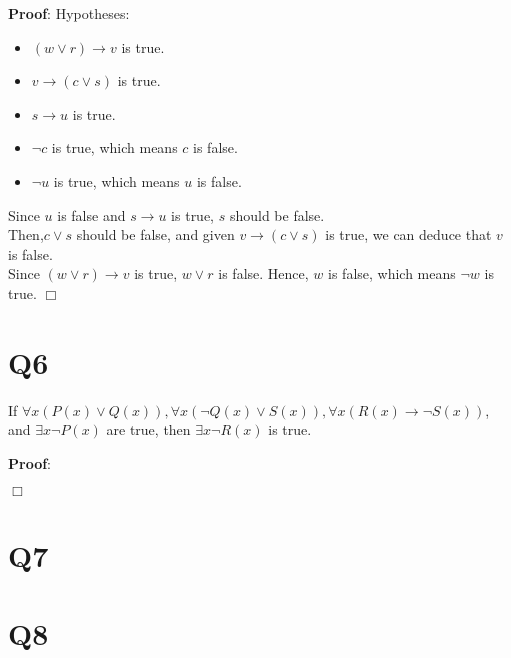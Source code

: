 \documentclass[11pt]{article}
\newenvironment{qparts}{\begin{enumerate}[{(}a{)}]}{\end{enumerate}}
\def\endproofmark{$\Box$}
\newenvironment{proof}{\par{\bf Proof}:}{\endproofmark\smallskip}
\begin{document}
\begin{qparts}
\begin{proof}
        Hypotheses:
        \begin{itemize}
            
            \item $(w \lor r)\to v$ is true.
            \item $v \to (c \lor s)$ is true.
            \item $s \to u$ is true.
            \item $\lnot c$ is true, which means $c$ is false.
            \item $\lnot u$ is true, which means $u$ is false.
        \end{itemize}
        Since $u$ is false and $s \to u$ is true, $s$ should be false.\\
        Then,$c \lor s$ should be false, and given $v \to (c \lor s)$ is true,
        we can deduce that $v$ is false.\\
        Since $(w \lor r)\to v$ is true, $w \lor r$ is false. Hence, $w$ is false, which means $\lnot w$ is true.
    \end{proof} 
\end{qparts}

\section*{Q6}
If $\forall x(P(x)\lor Q(x)),
\forall x(\lnot Q(x)\lor S(x)),
\forall x(R(x)\to \lnot S(x))$, 
and $\exists x\lnot P(x)$ are true, 
then $\exists x\lnot R(x)$ is true.
\begin{proof}
    
\end{proof}
\section*{Q7}


\section*{Q8}
\end{document}
